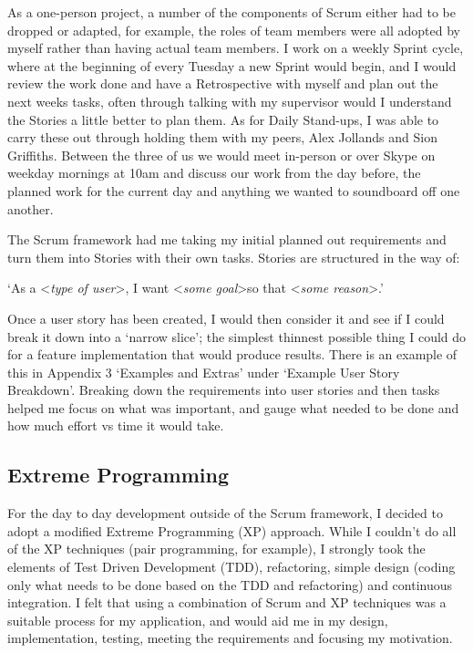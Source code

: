 As a one-person project, a number of the components of Scrum either had to be dropped or adapted, for example, the roles of team members were all adopted by myself rather than having actual team members. I work on a weekly Sprint cycle, where at the beginning of every Tuesday a new Sprint would begin, and I would review the work done and have a Retrospective with myself and plan out the next weeks tasks, often through talking with my supervisor would I understand the Stories a little better to plan them. As for Daily Stand-ups, I was able to carry these out through holding them with my peers, Alex Jollands and Sion Griffiths. Between the three of us we would meet in-person or over Skype on weekday mornings at 10am and discuss our work from the day before, the planned work for the current day and anything we wanted to soundboard off one another.


The Scrum framework had me taking my initial planned out requirements and turn them into Stories with their own tasks. Stories are structured in the way of:
\newline

`As a \textless \textit{type of user}\textgreater, I want \textless \textit{some goal}\textgreater so that \textless \textit{some reason}\textgreater.'\cite{userstories}
\newline

Once a user story has been created, I would then consider it and see if I could break it down into a `narrow slice'; the simplest thinnest possible thing I could do for a feature implementation that would produce results. There is an example of this in Appendix 3 `Examples and Extras' under `Example User Story Breakdown'. Breaking down the requirements into user stories and then tasks helped me focus on what was important, and gauge what needed to be done and how much effort vs time it would take.

\subsection{Extreme Programming}
For the day to day development outside of the Scrum framework, I decided to adopt a modified Extreme Programming (XP) approach\cite{xp}. While I couldn't do all of the XP techniques (pair programming, for example), I strongly took the elements of Test Driven Development (TDD), refactoring, simple design (coding only what needs to be done based on the TDD and refactoring) and continuous integration. I felt that using a combination of Scrum and XP techniques was a suitable process for my application, and would aid me in my design, implementation, testing, meeting the requirements and focusing my motivation.

